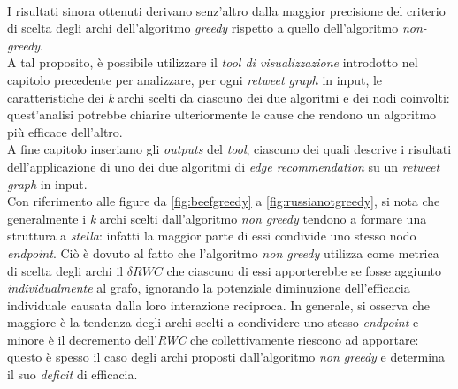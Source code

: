 \\I risultati sinora ottenuti derivano senz'altro dalla maggior precisione del criterio di scelta degli archi dell'algoritmo \textit{greedy} rispetto a quello dell'algoritmo \textit{non-greedy}. 
\\A tal proposito, è possibile utilizzare il \textit{tool di visualizzazione} introdotto nel capitolo precedente per analizzare, per ogni \textit{retweet graph} in input, le caratteristiche dei \textit{k} archi scelti da ciascuno dei due algoritmi e dei nodi coinvolti: quest'analisi potrebbe chiarire ulteriormente le cause che rendono un algoritmo più efficace dell'altro. 
\\A fine capitolo inseriamo gli \textit{outputs} del \textit{tool}, ciascuno dei quali descrive i risultati dell'applicazione di uno dei due algoritmi di \textit{edge recommendation} su un \textit{retweet graph} in input.
\\
Con riferimento alle figure da \ref{fig:beefgreedy} a \ref{fig:russianotgreedy}, si nota che generalmente i \textit{k} archi scelti dall'algoritmo \textit{non greedy} tendono a formare una struttura a \textit{stella}: infatti la maggior parte di essi condivide uno stesso nodo \textit{endpoint}. Ciò è dovuto al fatto che l'algoritmo \textit{non greedy} utilizza come metrica di scelta degli archi il \textit{$\delta RWC$} che ciascuno di essi apporterebbe se fosse aggiunto \textit{individualmente} al grafo, ignorando la potenziale diminuzione dell'efficacia individuale causata dalla loro interazione reciproca. In generale, si osserva che maggiore è la tendenza degli archi scelti a condividere uno stesso \textit{endpoint} e minore è il decremento dell'\textit{RWC} che collettivamente riescono ad apportare: questo è spesso il caso degli archi proposti dall'algoritmo \textit{non greedy} e determina il suo \textit{deficit} di efficacia. 
